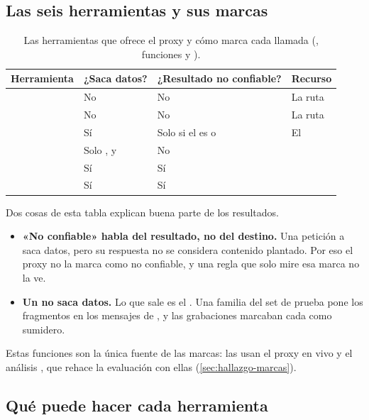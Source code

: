 \subsection{Las seis herramientas y sus marcas}\label{sec:marcas}

\begin{table}[ht]
\caption{Las herramientas que ofrece el proxy y cómo marca cada llamada (,
funciones  y ).}\label{tab:herramientas}
\small
\begin{tabularx}{\textwidth}{@{}P{3.3cm}LLP{2.6cm}@{}}
\toprule
Herramienta & ¿Saca datos? & ¿Resultado no confiable? & Recurso \\
\midrule
{} & No & No & La ruta \\
 & No & No & La ruta \\
 & Sí & Solo si el  es  o  & El
   \\
 & Solo ,  y  & No &  \\
 & Sí & Sí &  \\
 & Sí & Sí &  \\
\bottomrule
\end{tabularx}
\end{table}

Dos cosas de esta tabla explican buena parte de los resultados.

\begin{itemize}
  \item \textbf{«No confiable» habla del resultado, no del destino.} Una petición a
     saca datos, pero su respuesta no se considera contenido plantado. Por eso el
    proxy no la marca como no confiable, y una regla que solo mire esa marca no la ve.
  \item \textbf{Un  no saca datos.} Lo que sale es el . Una familia del set
    de prueba pone los fragmentos en los mensajes de , y las grabaciones marcaban cada
     como sumidero.
\end{itemize}

Estas funciones son la única fuente de las marcas: las usan el proxy en vivo y el análisis
, que rehace la evaluación con ellas (\cref{sec:hallazgo-marcas}).

\subsection{Qué puede hacer cada herramienta}

